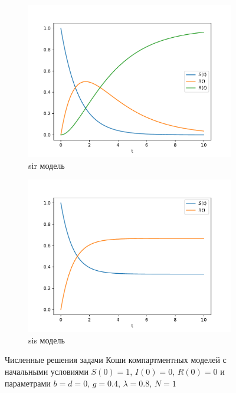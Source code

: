\documentclass[a4paper,12pt]{article} %
\begin{document}
\begin{figure}[]
    \centering
    \begin{subfigure}{0.45\linewidth}
        \centering
        \includegraphics[width=\linewidth]{images/sir.pdf}
        \caption{\gls{sir} модель}
    \end{subfigure}
    \hfill
    \begin{subfigure}{0.45\linewidth}
        \centering
        \includegraphics[width=\linewidth]{images/sis.pdf}
        \caption{\gls{sis} модель}
    \end{subfigure}
    \caption{Численные решения задачи Коши компартментных моделей с начальными условиями $S(0)=1$, $I(0)=0$, $R(0)=0$ и параметрами $b=d=0$, $g=0.4$, $\lambda=0.8$, $N=1$}
\end{figure}
\end{document}
